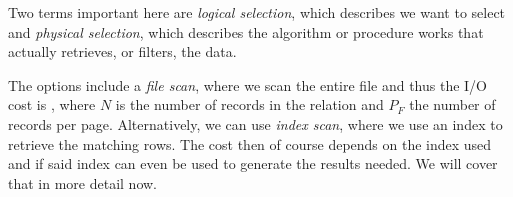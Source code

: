 Two terms important here are \textit{logical selection}, which describes  we want to select and \textit{physical selection},
which describes  the algorithm or procedure works that actually retrieves, or filters, the data.

The options include a \textit{file scan}, where we scan the entire file and thus the I/O cost is ,
where $N$ is the number of records in the relation and $P_F$ the number of records per page.
Alternatively, we can use \textit{index scan}, where we use an index to retrieve the matching rows.
The cost then of course depends on the index used and if said index can even be used to generate the results needed. We will cover that in more detail now.
